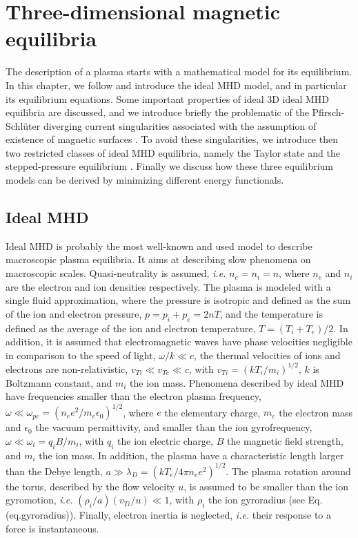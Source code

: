 \documentclass[my_thesis.tex]{subfiles}
\begin{document}
\chapter{Three-dimensional magnetic equilibria} \label{chap.3d magnetic equilibria}
The description of a plasma starts with a mathematical model for its equilibrium. In this chapter, we follow \citet{Freidberg2014} and introduce the ideal MHD model, and in particular its equilibrium equations. Some important properties of ideal 3D ideal MHD equilibria are discussed, and we introduce briefly the problematic of the Pfirsch-Schl\"uter diverging current singularities associated with the assumption of existence of magnetic surfaces \citep{Grad1967}. To avoid these singularities, we introduce then two restricted classes of ideal MHD equilibria, namely the Taylor state \citep{Taylor1974,Taylor1986} and the stepped-pressure equilibrium \citep{Hole2006}. Finally we discuss how these three equilibrium models can be derived by minimizing different energy functionals.

\section{Ideal MHD}
\label{section ideal mhd}
Ideal \ac{MHD} is probably the most well-known and used model to describe macroscopic plasma equilibria. It aims at describing slow phenomena on macroscopic scales. Quasi-neutrality is assumed, \textit{i.e.} $n_e=n_i=n$, where $n_e$ and $n_i$ are the electron and ion densities respectively. The plasma is modeled with a single fluid approximation, where the pressure is isotropic and defined as the sum of the ion and electron pressure, $p=p_i+p_e=2nT$, and the temperature is defined as the average of the ion and electron temperature, $T=(T_i+T_e)/2$. In addition, it is assumed that electromagnetic waves have phase velocities negligible in comparison to the speed of light, $\omega/k\ll c$, the thermal velocities of ions and electrons are non-relativistic, $v_{Ti}\ll v_{Te}\ll c$, with $v_{Ti}=(kT_i/m_i)^{1/2}$, $k$ is Boltzmann constant, and $m_i$ the ion mass. Phenomena described by ideal MHD have frequencies smaller than the electron plasma frequency, $\omega\ll \omega_{pe}=(n_ee^2/m_e\epsilon_0)^{1/2}$, where $e$ the elementary charge, $m_e$ the electron mass and $\epsilon_0$ the vacuum permittivity, and smaller than the ion gyrofrequency, $\omega\ll\omega_i=q_iB/m_i$, with $q_i$ the ion electric charge, $B$ the magnetic field strength, and $m_i$ the ion mass. In addition, the plasma have a characteristic length larger than the Debye length, $a\gg \lambda_D=(kT_e/4\pi n_e e^2)^{1/2}$. The plasma rotation around the torus, described by the flow velocity $u$, is assumed to be smaller than the ion gyromotion, \textit{i.e.} $(\rho_i/a)(v_{Ti}/u)\ll 1$, with $\rho_i$ the ion gyroradius (see Eq.(eq.gyroradius)). Finally, electron inertia is neglected, \textit{i.e.} their response to a force is instantaneous.
\end{document}
